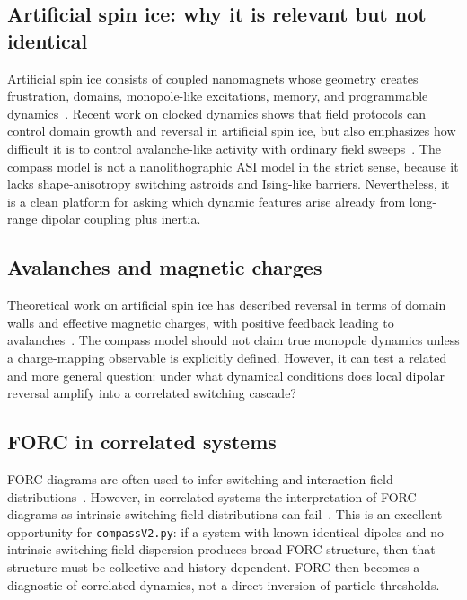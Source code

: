 \documentclass[11pt,a4paper]{article}
\newcommand{\code}[1]{\texttt{#1}}
\begin{document}
\subsection{Artificial spin ice: why it is relevant but not identical}

Artificial spin ice consists of coupled nanomagnets whose geometry creates frustration, domains, monopole-like excitations, memory, and programmable dynamics~\cite{nisoli2013,skjaervoe2020}. Recent work on clocked dynamics shows that field protocols can control domain growth and reversal in artificial spin ice, but also emphasizes how difficult it is to control avalanche-like activity with ordinary field sweeps~\cite{jensen2024}. The compass model is not a nanolithographic ASI model in the strict sense, because it lacks shape-anisotropy switching astroids and Ising-like barriers. Nevertheless, it is a clean platform for asking which dynamic features arise already from long-range dipolar coupling plus inertia.

\subsection{Avalanches and magnetic charges}

Theoretical work on artificial spin ice has described reversal in terms of domain walls and effective magnetic charges, with positive feedback leading to avalanches~\cite{mellado2010}. The compass model should not claim true monopole dynamics unless a charge-mapping observable is explicitly defined. However, it can test a related and more general question: under what dynamical conditions does local dipolar reversal amplify into a correlated switching cascade?

\subsection{FORC in correlated systems}

FORC diagrams are often used to infer switching and interaction-field distributions~\cite{pike1999,roberts2000}. However, in correlated systems the interpretation of FORC diagrams as intrinsic switching-field distributions can fail~\cite{ruta2017}. This is an excellent opportunity for \code{compassV2.py}: if a system with known identical dipoles and no intrinsic switching-field dispersion produces broad FORC structure, then that structure must be collective and history-dependent. FORC then becomes a diagnostic of correlated dynamics, not a direct inversion of particle thresholds.
\end{document}
